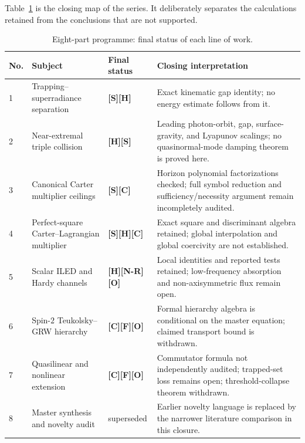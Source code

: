 \documentclass[11pt,a4paper]{article}
\newcommand{\VS}{\textcolor{vs}{\textbf{[S]}}}
\newcommand{\VN}{\textcolor{vn}{\textbf{[N-R]}}}
\newcommand{\VH}{\textcolor{vh}{\textbf{[H]}}}
\newcommand{\CC}{\textcolor{cc}{\textbf{[C]}}}
\newcommand{\FF}{\textcolor{ff}{\textbf{[F]}}}
\newcommand{\OO}{\textcolor{oo}{\textbf{[O]}}}
\theoremstyle{remark}
\theoremstyle{definition}
\begin{document}
Table~\ref{tab:programme} is the closing map of the series. It deliberately separates the calculations retained from the conclusions that are not supported.

\begin{table}[H]
\centering
\caption{Eight-part programme: final status of each line of work.}
\label{tab:programme}
\small
\begin{tabularx}{\linewidth}{@{}p{0.8cm}p{3.55cm}p{2.2cm}X@{}}
\toprule
No. & Subject & Final status & Closing interpretation \\
\midrule
1 & Trapping--superradiance separation & \VS\VH & Exact kinematic gap identity; no energy estimate follows from it. \\
2 & Near-extremal triple collision & \VH\VS & Leading photon-orbit, gap, surface-gravity, and Lyapunov scalings; no quasinormal-mode damping theorem is proved here. \\
3 & Canonical Carter multiplier ceilings & \VS\CC & Horizon polynomial factorizations checked; full symbol reduction and sufficiency/necessity argument remain incompletely audited. \\
4 & Perfect-square Carter--Lagrangian multiplier & \VS\VH\CC & Exact square and discriminant algebra retained; global interpolation and global coercivity are not established. \\
5 & Scalar ILED and Hardy channels & \VH\VN\OO & Local identities and reported tests retained; low-frequency absorption and non-axisymmetric flux remain open. \\
6 & Spin-$2$ Teukolsky--GRW hierarchy & \CC\FF\OO & Formal hierarchy algebra is conditional on the master equation; claimed transport bound is withdrawn. \\
7 & Quasilinear and nonlinear extension & \CC\FF\OO & Commutator formula not independently audited; trapped-set loss remains open; threshold-collapse theorem withdrawn. \\
8 & Master synthesis and novelty audit & superseded & Earlier novelty language is replaced by the narrower literature comparison in this closure. \\
\bottomrule
\end{tabularx}
\end{table}
\end{document}
